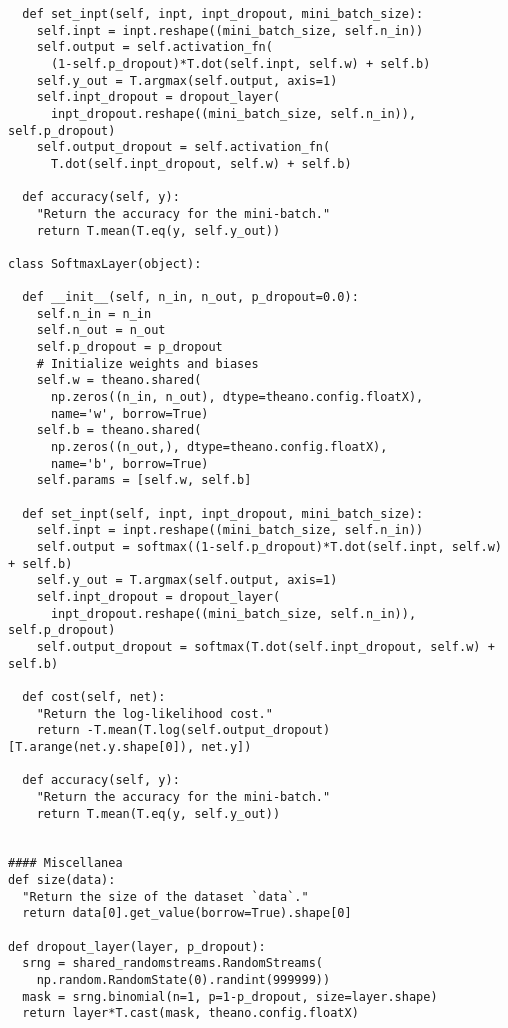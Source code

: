 \documentclass[a4paper,twoside,10pt]{book}
\begin{document}
\begin{lstlisting}
  def set_inpt(self, inpt, inpt_dropout, mini_batch_size):
    self.inpt = inpt.reshape((mini_batch_size, self.n_in))
    self.output = self.activation_fn(
      (1-self.p_dropout)*T.dot(self.inpt, self.w) + self.b)
    self.y_out = T.argmax(self.output, axis=1)
    self.inpt_dropout = dropout_layer(
      inpt_dropout.reshape((mini_batch_size, self.n_in)), self.p_dropout)
    self.output_dropout = self.activation_fn(
      T.dot(self.inpt_dropout, self.w) + self.b)

  def accuracy(self, y):
    "Return the accuracy for the mini-batch."
    return T.mean(T.eq(y, self.y_out))

class SoftmaxLayer(object):

  def __init__(self, n_in, n_out, p_dropout=0.0):
    self.n_in = n_in
    self.n_out = n_out
    self.p_dropout = p_dropout
    # Initialize weights and biases
    self.w = theano.shared(
      np.zeros((n_in, n_out), dtype=theano.config.floatX),
      name='w', borrow=True)
    self.b = theano.shared(
      np.zeros((n_out,), dtype=theano.config.floatX),
      name='b', borrow=True)
    self.params = [self.w, self.b]

  def set_inpt(self, inpt, inpt_dropout, mini_batch_size):
    self.inpt = inpt.reshape((mini_batch_size, self.n_in))
    self.output = softmax((1-self.p_dropout)*T.dot(self.inpt, self.w) + self.b)
    self.y_out = T.argmax(self.output, axis=1)
    self.inpt_dropout = dropout_layer(
      inpt_dropout.reshape((mini_batch_size, self.n_in)), self.p_dropout)
    self.output_dropout = softmax(T.dot(self.inpt_dropout, self.w) + self.b)

  def cost(self, net):
    "Return the log-likelihood cost."
    return -T.mean(T.log(self.output_dropout)[T.arange(net.y.shape[0]), net.y])

  def accuracy(self, y):
    "Return the accuracy for the mini-batch."
    return T.mean(T.eq(y, self.y_out))


#### Miscellanea
def size(data):
  "Return the size of the dataset `data`."
  return data[0].get_value(borrow=True).shape[0]

def dropout_layer(layer, p_dropout):
  srng = shared_randomstreams.RandomStreams(
    np.random.RandomState(0).randint(999999))
  mask = srng.binomial(n=1, p=1-p_dropout, size=layer.shape)
  return layer*T.cast(mask, theano.config.floatX)

\end{lstlisting}
\end{document}
